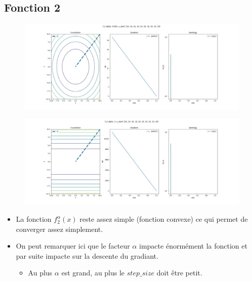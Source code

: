 \documentclass[twoside,10pt,a4paper]{article}
\numberwithin{equation}{section}					%
\numberwithin{figure}{section}						%
\begin{document}
\subsection{Fonction 2 }\label{sec:subsection2}
\begin{figure}[H]
    \centering
    \includegraphics[width=\textwidth]{imgs/newton/f_2_a-0.005_newton.png}
    \caption{}
\end{figure}
\begin{figure}[H]
    \centering
    \includegraphics[width=\textwidth]{imgs/newton/f_2_a-3_newton.png}
    \caption{}
\end{figure}
\begin{itemize}
	\item La fonction $f_2^{\alpha}(x)$ reste assez simple (fonction convexe) ce qui permet de converger assez simplement.
	\item On peut remarquer ici que le facteur $\alpha$ impacte énormément la fonction et par suite impacte sur la descente du gradiant.
	\begin{itemize}
    	\item Au plus $\alpha$ est grand, au plus le $step\_size$ doit être petit.
	\end{itemize}
\end{itemize}
\end{document}
